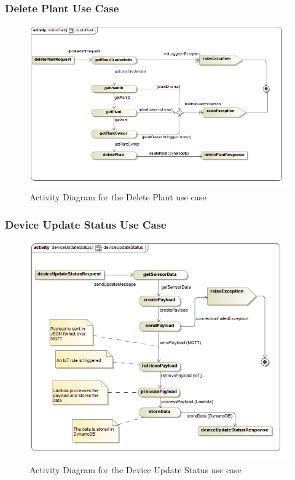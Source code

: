 \documentclass{article}
\begin{document}
		\subsubsection{Delete Plant Use Case}
			\begin{figure}[H]
				\includegraphics[width=\linewidth]{deletePlant.jpg}
				\caption{Activity Diagram for the Delete Plant use case}
			\end{figure}
	\newpage
		\subsubsection{Device Update Status Use Case}
			\begin{figure}[H]
				\includegraphics[width=\linewidth]{deviceUpdateStatus.jpg}
				\caption{Activity Diagram for the Device Update Status use case}
			\end{figure}
	\newpage
	
\end{document}
